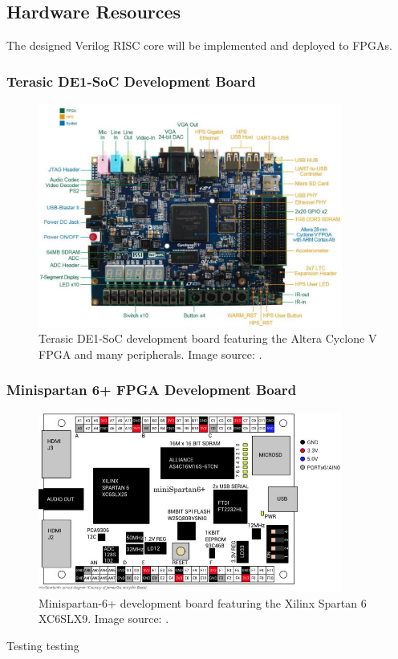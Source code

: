 \documentclass[11pt,a4paper]{report}
\begin{document}
{\subsection{Hardware Resources}
The designed Verilog RISC core will be implemented and deployed to FPGAs.

\subsubsection{Terasic DE1-SoC Development Board}


\begin{figure}[h]
\centering 
\includegraphics[width=10cm]{../img/de1soc}
\caption{Terasic DE1-SoC development board featuring the Altera Cyclone V FPGA and many peripherals. Image source: \cite{de1soc}.}
\label{fig:de1soc}
\end{figure}

\subsubsection{Minispartan 6+ FPGA Development Board}

\begin{figure}[h]
\centering 
\includegraphics[width=10cm]{../img/minispartan}
\caption{Minispartan-6+ development board featuring the Xilinx Spartan 6 XC6SLX9. Image source: \cite{minispartan}.}
\label{fig:de1soc}
\end{figure}
Testing testing

}
\end{document}
